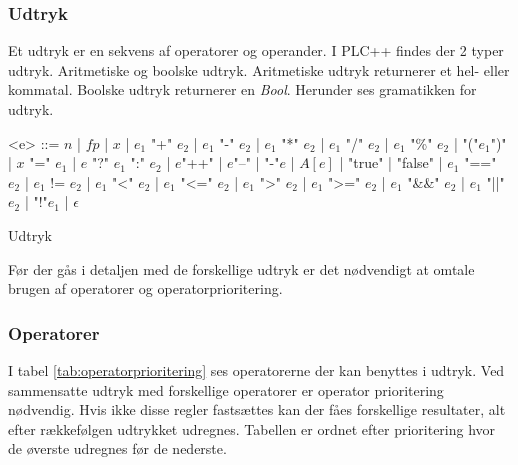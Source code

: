\subsubsection{Udtryk}
Et udtryk er en sekvens af operatorer og operander. I PLC++ findes der 2 typer udtryk. Aritmetiske og boolske udtryk. Aritmetiske udtryk returnerer et hel- eller kommatal. Boolske udtryk returnerer en \textit{Bool}. Herunder ses gramatikken for udtryk.

\begin{Grammar}
 \begin{grammar}

 <e> ::= $n$ | $fp$ | $x$  | $e_1$ "+" $e_2$ | $e_1$ "-" $e_2$ | $e_1$ "*" $e_2$ | $e_1$ "/" $e_2$ | $e_1$ "\%" $e_2$ | "("$e_1$")" | $x$ "=" $e_1$ | $e$ "?" $e_1$ ":" $e_2$ | $e$"++" | $e$"--" | "-"$e$ | $A[e]$ | "true" | "false" | $e_1$ "==" $e_2$ | $e_1$ != $e_2$ | $e_1$ "<" $e_2$ | $e_1$ "<=" $e_2$ | $e_1$ ">" $e_2$ | $e_1$ ">=" $e_2$ | $e_1$ "\&\&" $e_2$ | $e_1$ "||" $e_2$ | "!"$e_1$ | $\epsilon$

 \end{grammar}
 \caption{Udtryk}\label{gra:expressions}
\end{Grammar}

\noindent Før der gås i detaljen med de forskellige udtryk er det nødvendigt at omtale brugen af operatorer og operatorprioritering.

\subsubsection{Operatorer}
I tabel \ref{tab:operatorprioritering} ses operatorerne der kan benyttes i udtryk. Ved sammensatte udtryk med forskellige operatorer er operator prioritering nødvendig. Hvis ikke disse regler fastsættes kan der fåes forskellige resultater, alt efter rækkefølgen udtrykket udregnes. Tabellen er ordnet efter prioritering hvor de øverste udregnes før de nederste.

